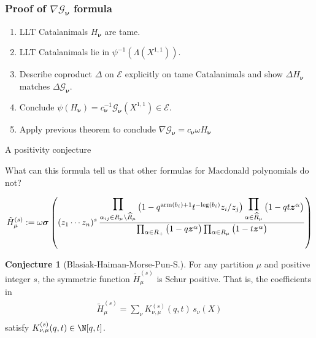\documentclass[dvipsnames]{beamer}
\newcommand{\zz}{{\boldsymbol z}}
\newcommand{\sigmabold}{\boldsymbol \sigma}
\newcommand{\Htild}{\tilde{H}}
\newcommand{\Gcal}{{\mathcal G}}
\newcommand{\nubold}{{\boldsymbol \nu }}
\newcommand{\leg}{{\mathrm{leg}}}
\newcommand{\arm}{{\mathrm{arm}}}
\newcommand{\Ecal}{\mathcal{E}}
\newcommand{\bbb}{{s}}
\theoremstyle{definition}
\newtheorem{conjecture}[theorem]{Conjecture}
\begin{document}
\begin{frame}
  \frametitle{Proof of \(\nabla \Gcal_\nubold\) formula}
  \begin{enumerate}
  \item LLT Catalanimals \(H_\nubold\) are tame.
  \item LLT Catalanimals lie in \(\psi^{-1}(\Lambda(X^{1,1}))\).
  \item Describe coproduct \(\Delta\) on \(\Ecal\) explicitly on tame
    Catalanimals and show \(\Delta H_\nubold\) matches \(\Delta
    \Gcal_\nubold\).
  \item Conclude \(\psi(H_\nubold) = c_\nubold^{-1}
    \Gcal_\nubold(X^{1,1}) \in \Ecal\).
  \item Apply previous theorem to conclude \(\nabla \Gcal_\nubold =
    c_\nubold \omega H_\nubold\)
  \end{enumerate}
\end{frame}
\begin{frame}{A positivity conjecture}
  \begin{center}
What can this formula tell us that other formulas for Macdonald polynomials do not?
\end{center}
\pause


\vspace{-3mm}
\vspace{-1mm}
{\small \begin{align*}
  \Htild^{(s)}_{\mu} := \omega \sigmabold  \left( (z_1\cdots z_n)^s \,
\frac{
 \displaystyle\prod_{\alpha_{ij} \in R_\mu \setminus \widehat{R}_\mu }
 \raisebox{-1.4mm}{$\big(1- q^{\arm(b_i)+1} t^{-\leg(b_i)} z_i/z_j \big)$}
\displaystyle\prod_{\alpha \in \widehat{R}_{\mu}}
 \raisebox{-1.4mm}{$\big(1-q  t \zz^\alpha \big)$} } {\prod_{\alpha \in R_+} \big(1-q  \zz^\alpha\big)
\prod_{\alpha \in R_\mu} \big(1-t  \zz^\alpha\big)}\right)
\end{align*}}


\vspace{-1.4mm}
\begin{conjecture}[Blasiak-Haiman-Morse-Pun-S.]
For any partition  $\mu$ and positive integer $s$, the symmetric function
 $\Htild^{(s)}_{\mu}$ is Schur positive.
That is, the coefficients in
\vspace{-1mm}
\begin{align*}
\Htild^{(s)}_{\mu}
= \sum_{\nu } K^{(s)} _{\nu , \mu}(q,t)\, s_\nu(X)  \\[-10mm]
\end{align*}
satisfy $K^{(\bbb)}_{\nu , \mu}(q,t)\in \N[q,t]$.
\end{conjecture}
\end{frame}
\end{document}
